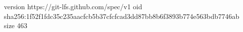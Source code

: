 version https://git-lfs.github.com/spec/v1
oid sha256:1f52f1fdc35c235aacfcb5b37cfcfcad3dd87bb8b6f3893b774e563bdb7746ab
size 463
